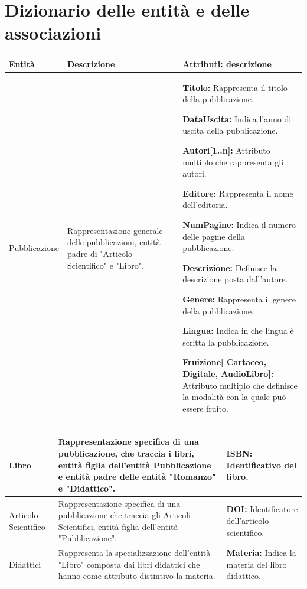     \section{Dizionario delle entità e delle associazioni}
\begin{center}    
    \begin{tabular}{ | m{5cm} | m{5cm}| m{6cm} | } 
        \hline
             {\bf Entità} & {\bf Descrizione}  & {\bf Attributi: descrizione}\\ 
         \hline
               Pubblicazione & Rappresentazione generale delle pubblicazioni, entità padre di "Articolo Scientifico" e "Libro".   
                &  
                 {\bf Titolo:} Rappresenta il titolo della pubblicazione.\par 
                 {\bf DataUscita:} Indica l'anno di uscita della pubblicazione.\par 
                 {\bf Autori[1..n]:} Attributo multiplo che rappresenta gli autori.\par 
                 {\bf Editore:} Rappresenta il nome dell'editoria.\par 
                 {\bf NumPagine:} Indica il numero delle pagine della pubblicazione.\par 
                 {\bf Descrizione:} Definisce la descrizione posta dall'autore.\par 
                 {\bf Genere:} Rappresenta il genere della pubblicazione.\par 
                 {\bf Lingua:} Indica in che lingua è scritta la pubblicazione.\par 
                 {\bf Fruizione[ Cartaceo, Digitale, AudioLibro]:} Attributo multiplo che definisce la modalità con la quale può essere fruito.\par 
             \\
         \hline
          \end{tabular}
          \begin{tabular}{ | m{5cm} | m{5cm}| m{6cm} | } 
            \hline
            Libro & Rappresentazione specifica di una pubblicazione, che traccia i libri, entità figlia dell'entità Pubblicazione e entità padre delle entità "Romanzo" e "Didattico".
            &    
            {\bf ISBN:} Identificativo del libro.\par 
            \\
             \hline

            Articolo Scientifico & Rappresentazione specifica di una pubblicazione che traccia gli Articoli Scientifici, entità figlia dell'entità "Pubblicazione".
            &  
             {\bf DOI:} Identificatore dell'articolo scientifico.\par 
             \\ 
        \hline
            Didattici & Rappresenta la specializzazione dell'entità "Libro" composta dai libri didattici che hanno come attributo distintivo la materia.
            & 
            {\bf Materia:} Indica la materia del libro didattico.
            \par 
            \\ 
             \hline
       

\end{tabular}
\end{center}

